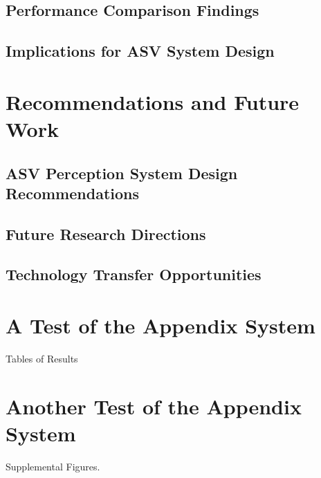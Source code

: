 \documentclass{erauthesis}
\begin{document}
\section{Performance Comparison Findings}

\section{Implications for ASV System Design}

\chapter{Recommendations and Future Work}


\section{ASV Perception System Design Recommendations}

\section{Future Research Directions}

\section{Technology Transfer Opportunities}





% 


\backmatter

\chapter{A Test of the Appendix System}

Tables of Results

\chapter{Another Test of the Appendix System}
Supplemental Figures.
\end{document}
